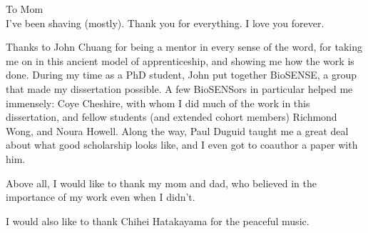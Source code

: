 \begin{frontmatter}

\begin{dedication}
\null\vfil
\begin{center}


To Mom\\\vspace{12pt} I've been shaving (mostly). Thank you for everything. I
love you forever.
\end{center}
\vfil\null
\end{dedication}


\tableofcontents
\clearpage
\listoffigures
\clearpage
\listoftables

\begin{acknowledgements}
Thanks to John Chuang for being a mentor in every sense of the word, for taking
me on in this ancient model of apprenticeship, and showing me how the work is
done. During my time as a PhD student, John put together BioSENSE, a group that
made my dissertation possible. A few BioSENSors in particular helped me
immensely: Coye Cheshire, with whom I did much of the work in this dissertation,
and fellow students (and extended cohort members) Richmond Wong, and Noura
Howell. Along the way, Paul Duguid taught me a great deal about what good
scholarship looks like, and I even got to coauthor a paper with him.

Above all, I would like to thank my mom and dad, who believed in the importance
of my work even when I didn't.

I would also like to thank Chihei Hatakayama for the peaceful music.
\end{acknowledgements}





\end{frontmatter}
